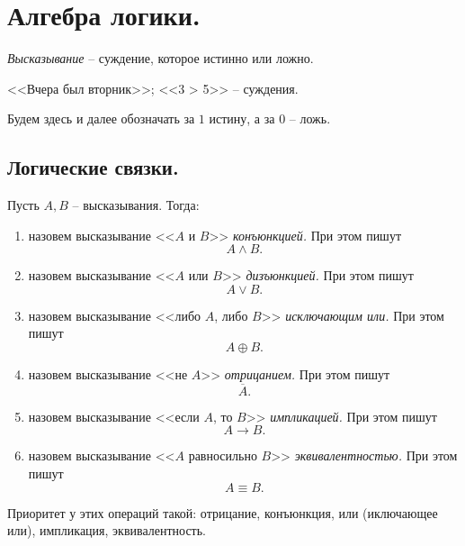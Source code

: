 
\section{Алгебра логики.}

\begin{definition}
    \textit{Высказывание} -- суждение, которое истинно или ложно.
\end{definition}

\begin{example}
    <<Вчера был вторник>>; <<3 > 5>> -- суждения.
\end{example}

Будем здесь и далее обозначать за $1$ истину, а за $0$ -- ложь.

\subsection{Логические связки.}

\begin{definition}
    Пусть $A, B$ -- высказывания. Тогда:
    \begin{enumerate}
        \item назовем высказывание <<$A$ и $B$>> \textit{конъюнкцией.} При этом пишут $$A \wedge B.$$
        
        \item назовем высказывание <<$A$ или $B$>> \textit{дизъюнкцией.} При этом пишут $$A \vee B.$$
        
        \item назовем высказывание <<либо $A$, либо $B$>> \textit{исключающим или.} При этом пишут $$A \oplus B.$$

        \item назовем высказывание <<не $A$>> \textit{отрицанием.} При этом пишут $$\overline{A}.$$

        \item назовем высказывание <<если $A$, то $B$>> \textit{импликацией.} При этом пишут $$A \rightarrow B.$$

        \item назовем высказывание <<$A$ равносильно $B$>> \textit{эквивалентностью.} При этом пишут $$ A \equiv B.$$
    \end{enumerate}
\end{definition}

Приоритет у этих операций такой: отрицание, конъюнкция, или (иключающее или), импликация, эквивалентность.

